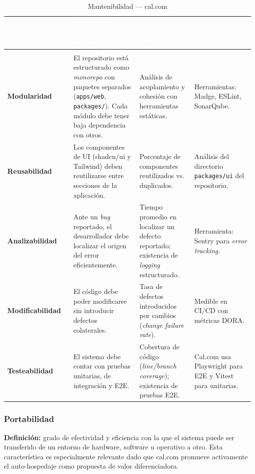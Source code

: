 \documentclass[12pt, a4paper]{article}
\newcommand{\rowpair}{\rowcolor{grisMedio}}
\newcommand{\rowimpar}{\rowcolor{grisClaro}}
\begin{document}
\begin{longtable}{>{\bfseries}p{3cm} p{4.5cm} p{4cm} p{3.5cm}}
\caption{Mantenibilidad — cal.com} \label{tab:mantenibilidad} \\
\rowcolor{azulClaro}
\textcolor{white}{\textbf{Subcaracterística}} &
\textcolor{white}{\textbf{Descripción aplicada a cal.com}} &
\textcolor{white}{\textbf{Criterio de evaluación}} &
\textcolor{white}{\textbf{Observaciones}} \\
\endfirsthead
\multicolumn{4}{c}{\tablename\ \thetable{} -- continuación} \\
\endhead
\rowpair
Modularidad &
El repositorio está estructurado como \textit{monorepo} con paquetes separados
(\texttt{apps/web}, \texttt{packages/}). Cada módulo debe tener baja dependencia con
otros. &
Análisis de acoplamiento y cohesión con herramientas estáticas. &
Herramientas: Madge, ESLint, SonarQube. \\
\rowimpar
Reusabilidad &
Los componentes de UI (shadcn/ui y Tailwind) deben reutilizarse entre secciones de la
aplicación. &
Porcentaje de componentes reutilizados vs. duplicados. &
Análisis del directorio \texttt{packages/ui} del repositorio. \\
\rowpair
Analizabilidad &
Ante un \textit{bug} reportado, el desarrollador debe localizar el origen del error
eficientemente. &
Tiempo promedio en localizar un defecto reportado; existencia de \textit{logging}
estructurado. &
Herramienta: Sentry para \textit{error tracking}. \\
\rowimpar
Modificabilidad &
El código debe poder modificarse sin introducir defectos colaterales. &
Tasa de defectos introducidos por cambios (\textit{change failure rate}). &
Medible en CI/CD con métricas DORA. \\
\rowpair
Testeabilidad &
El sistema debe contar con pruebas unitarias, de integración y E2E. &
Cobertura de código (\textit{line/branch coverage}); existencia de pruebas E2E. &
Cal.com usa Playwright para E2E y Vitest para unitarias. \\
\end{longtable}

\subsubsection{Portabilidad}

\textbf{Definición:} grado de efectividad y eficiencia con la que el sistema puede ser
transferido de un entorno de hardware, software u operativo a otro. Esta característica
es especialmente relevante dado que cal.com promueve activamente el auto-hospedaje como
propuesta de valor diferenciadora.
\end{document}
